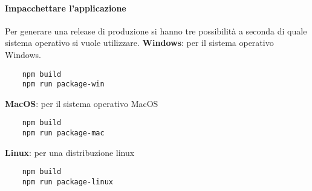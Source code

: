 \paragraph{Impacchettare l'applicazione}
Per generare una release di produzione si hanno tre possibilità a seconda di quale sistema operativo si vuole utilizzare.
\textbf{Windows}: per il sistema operativo Windows. \\
\begin{verbatim}
    npm build
    npm run package-win 
\end{verbatim}
\textbf{MacOS}: per il sistema operativo MacOS \\
\begin{verbatim}
    npm build
    npm run package-mac 
\end{verbatim}
\textbf{Linux}: per una distribuzione linux \\
\begin{verbatim}
    npm build
    npm run package-linux 
\end{verbatim}
